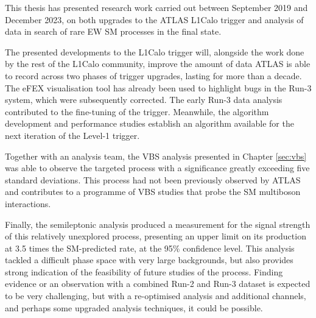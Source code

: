 This thesis has presented research work carried out between September 2019 and
December 2023, on both upgrades to the \ac{ATLAS} \ac{L1Calo} trigger and
analysis of data in search of rare \ac{EW} \ac{SM} processes in the \Zyjj final
state.

The presented developments to the \ac{L1Calo} trigger will, alongside the work
done by the rest of the \ac{L1Calo} community, improve the amount of data
\ac{ATLAS} is able to record across two phases of trigger upgrades, 
lasting for more than a decade. The \ac{eFEX} visualisation tool has already
been used to highlight bugs in the Run-3 system, which were subsequently
corrected. The early Run-3 data
analysis contributed to the fine-tuning of the \egamma trigger. Meanwhile, the
\eratio algorithm development and performance studies establish an algorithm
available for the next iteration of the Level-1 \egamma trigger.

Together with an analysis team, the \ac{VBS} \Zy analysis presented in Chapter
\ref{sec:vbs} was able to observe the targeted process with a significance
greatly exceeding five standard deviations. This process had not been previously
observed by \ac{ATLAS} and contributes to a programme of \ac{VBS} studies that
probe the \ac{SM} multiboson interactions.

Finally, the semileptonic \VZy analysis produced a measurement for the signal
strength of this relatively unexplored process, presenting an upper limit on its
production at 3.5 times the \ac{SM}-predicted rate, at the 95\% confidence
level. This analysis tackled a difficult phase space with very large
backgrounds, but also provides strong indication of the feasibility of future
studies of the process. Finding evidence or an observation with a combined Run-2
and Run-3 dataset is expected to be very challenging, but with a re-optimised
analysis and additional channels, and perhaps some upgraded analysis techniques,
it could be possible.
